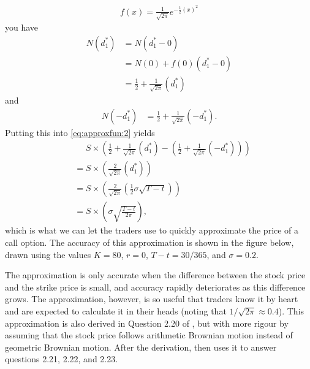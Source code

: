 \documentclass[11pt]{article}
\begin{document}
\begin{align*}
f(x) =
     \frac{1}{ \sqrt{ 2\pi } }
     e^{ - \frac{1}{2} (x)^2 }
\end{align*}
you have
\begin{align*}
N(d_1^*)&= N(d_1^* - 0) \\
            &= N(0) + f(0)(d_1^* - 0) \\
            &= \frac{1}{2} +  \frac{1}{ \sqrt{ 2\pi } }
            (d_1^* )
\end{align*}
and
\begin{align*}
N(-d_1^*) &= \frac{1}{2} +  \frac{1}{ \sqrt{ 2\pi } } (- d_1^* )
\text{.}
\end{align*}
Putting this into \eqref{eq:approxfun:2} yields
\begin{align*}
&\phantom{{}={}}
S \times \left(
\frac{1}{2} +  \frac{1}{ \sqrt{ 2\pi } } ( d_1^* ) -
\left(
\frac{1}{2} +  \frac{1}{ \sqrt{ 2\pi } } (- d_1^* )
\right)
\right)
\\
&=
S \times \left(
    \frac{2}{ \sqrt{ 2\pi } } ( d_1^* )
\right)
\\
&=
S \times \left(
    \frac{ 2 }{ \sqrt{ 2 \pi } }
    \left(
    \frac{1}{2} \sigma \sqrt{T - t}
    \right)
\right)
\\
&=
S \times \left(
     \sigma
    \sqrt{\frac{ T - t }{  2 \pi  }}
\right)
\text{,}
\end{align*}
which is what we can let the traders use to quickly approximate the price of a call option.
The accuracy of this approximation is shown in the figure below, drawn using
the values
$K = 80$,
$r = 0$,
$T-t = 30/365$, and
$\sigma=0.2$.
%
\begin{figure}[!htb]
\begin{center}

\end{center}
\end{figure}
%
%
The approximation is only accurate when the difference between the stock price and the strike price is small, and accuracy rapidly deteriorates as this difference grows.
The approximation, however, is so useful that traders know it by heart and are expected to calculate it in their heads (noting that $1/\sqrt{2\pi} \approx 0.4$).
This approximation is also derived in Question 2.20 of \citet{HeardOnTheStreet}, but with more rigour by assuming that the stock price follows arithmetic Brownian motion instead of geometric Brownian motion.
After the derivation, \citet{HeardOnTheStreet} then uses it to answer questions 2.21, 2.22, and 2.23.
\end{document}
